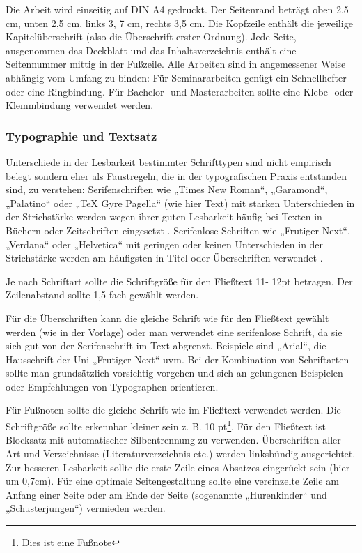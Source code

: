 Die Arbeit wird einseitig auf DIN A4 gedruckt. Der Seitenrand beträgt oben 2,5 cm, unten 2,5 cm, links 3, 7 cm, rechts 3,5 cm. Die Kopfzeile enthält die jeweilige Kapitelüberschrift (also die Überschrift erster Ordnung). Jede Seite, ausgenommen das Deckblatt und das Inhaltsverzeichnis enthält eine Seitennummer mittig in der Fußzeile. Alle Arbeiten sind in angemessener Weise abhängig vom Umfang zu binden: Für Seminararbeiten genügt ein Schnellhefter oder eine Ringbindung. Für Bachelor- und Masterarbeiten sollte eine Klebe- oder Klemmbindung verwendet werden.

\subsubsection{Typographie und Textsatz}\label{subsubsec:typographie}

Unterschiede in der Lesbarkeit bestimmter Schrifttypen sind nicht empirisch belegt sondern eher als Faustregeln, die in der typografischen Praxis entstanden sind, zu verstehen:  Serifenschriften wie „Times New Roman“, „Garamond“, „Palatino“ oder „TeX Gyre Pagella“ (wie hier Text)  mit starken Unterschieden in der Strichstärke werden wegen ihrer guten Lesbarkeit häufig bei Texten in Büchern oder Zeitschriften eingesetzt \cite[S.18]{gotz2004typo}. Serifenlose Schriften wie „Frutiger Next“, „Verdana“ oder „Helvetica“ mit geringen oder keinen Unterschieden in der Strichstärke werden am häufigsten in Titel oder Überschriften verwendet \cite[S.18]{gotz2004typo}. 

  Je nach Schriftart sollte die Schriftgröße für den Fließtext 11- 12pt betragen. Der Zeilenabstand sollte 1,5 fach gewählt werden.

Für die Überschriften kann die gleiche Schrift wie für den Fließtext gewählt werden (wie in der Vorlage) oder man verwendet eine serifenlose Schrift, da sie sich gut von der Serifenschrift im Text abgrenzt. Beispiele sind „Arial“, die Hausschrift der Uni „Frutiger Next“ uvm. Bei der Kombination von Schriftarten sollte man grundsätzlich vorsichtig vorgehen und sich an gelungenen Beispielen oder Empfehlungen von Typographen orientieren. 

Für Fußnoten sollte die gleiche Schrift wie im Fließtext verwendet werden. Die Schriftgröße sollte erkennbar kleiner sein z. B. 10 pt\footnote{Dies ist eine Fußnote}. Für den Fließtext ist Blocksatz mit automatischer Silbentrennung zu verwenden. Überschriften aller Art und Verzeichnisse (Literaturverzeichnis etc.) werden linksbündig ausgerichtet. Zur besseren Lesbarkeit sollte die erste Zeile eines Absatzes eingerückt sein (hier um 0,7cm). Für eine optimale Seitengestaltung sollte eine vereinzelte Zeile am Anfang einer Seite oder am Ende der Seite (sogenannte „Hurenkinder“ und „Schusterjungen“) vermieden werden.

